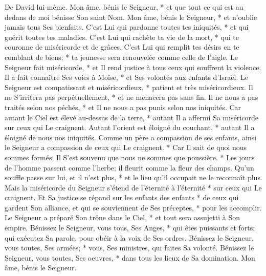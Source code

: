 De David lui-même. Mon âme, bénis le Seigneur, * et que tout ce qui est au dedans de moi bénisse Son saint Nom.
Mon âme, bénis le Seigneur, * et n'oublie jamais tous Ses bienfaits.
C'est Lui qui pardonne toutes tes iniquités, * et qui guérit toutes tes maladies.
C'est Lui qui rachète ta vie de la mort, * qui te couronne de miséricorde et de grâces.
C'est Lui qui remplit tes désirs en te comblant de biens; * ta jeunesse sera renouvelée comme celle de l'aigle.
Le Seigneur fait miséricorde, * et Il rend justice à tous ceux qui souffrent la violence.
Il a fait connaître Ses voies à Moïse, * et Ses volontés aux enfants d'Israël.
Le Seigneur est compatissant et miséricordieux, * patient et très miséricordieux.
Il ne S'irritera pas perpétuellement, * et ne menacera pas sans fin.
Il ne nous a pas traités selon nos péchés, * et Il ne nous a pas punis selon nos iniquités.
Car autant le Ciel est élevé au-dessus de la terre, * autant Il a affermi Sa miséricorde sur ceux qui Le craignent.
Autant l'orient est éloigné du couchant, * autant Il a éloigné de nous nos iniquités.
Comme un père a compassion de ses enfants, ainsi le Seigneur a compassion de ceux qui Le craignent. *
Car Il sait de quoi nous sommes formés; Il S'est souvenu que nous ne sommes que poussière. *
Les jours de l'homme passent comme l'herbe; il fleurit comme la fleur des champs.
Qu'un souffle passe sur lui, et il n'est plus, * et le lieu qu'il occupait ne le reconnaît plus.
Mais la miséricorde du Seigneur s'étend de l'éternité à l'éternité * sur ceux qui Le craignent. Et Sa justice se répand sur les enfants des enfants *
de ceux qui gardent Son alliance, et qui se souviennent de Ses préceptes, * pour les accomplir.
Le Seigneur a préparé Son trône dans le Ciel, * et tout sera assujetti à Son empire.
Bénissez le Seigneur, vous tous, Ses Anges, * qui êtes puissants et forts; qui exécutez Sa parole, pour obéir à la voix de Ses ordres.
Bénissez le Seigneur, vous toutes, Ses armées; * vous, Ses ministres, qui faites Sa volonté.
Bénissez le Seigneur, vous toutes, Ses oeuvres, * dans tous les lieux de Sa domination. Mon âme, bénis le Seigneur.

